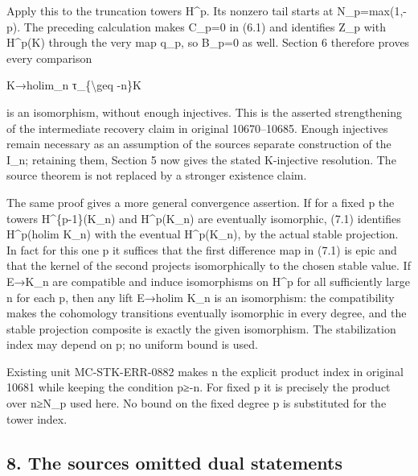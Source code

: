 Apply this to the truncation tower\textquotesingle s H\^{}p. Its nonzero tail starts at N\_\allowbreak{}p\allowbreak{}=max(1,\allowbreak{}-p)\allowbreak{}. The preceding calculation makes C\_\allowbreak{}p\allowbreak{}=0 in (6.1)\allowbreak{} and identifies Z\_\allowbreak{}p with H\textasciicircum{}p(K)\allowbreak{} through the very map q\_\allowbreak{}p,\allowbreak{} so B\_\allowbreak{}p\allowbreak{}=0 as well. Section 6 therefore proves every comparison

K\allowbreak{}→holim\_\allowbreak{}n τ\_\allowbreak{}\{\textbackslash{}geq -n\}K

is an isomorphism,\allowbreak{} without enough injectives. This is the asserted strengthening of the intermediate recovery claim in original 10670–\allowbreak{}10685. Enough injectives remain necessary as an assumption of the source\textquotesingle s separate construction of the I\_\allowbreak{}n; retaining them,\allowbreak{} Section 5 now gives the stated K-injective resolution. The source theorem is not replaced by a stronger existence claim.

The same proof gives a more general convergence assertion. If for a fixed p the towers H\textasciicircum{}\{p-1\}(K\_\allowbreak{}n)\allowbreak{} and H\textasciicircum{}p(K\_\allowbreak{}n)\allowbreak{} are eventually isomorphic,\allowbreak{} (7.1)\allowbreak{} identifies H\^{}p(holim K\_\allowbreak{}n)\allowbreak{} with the eventual H\textasciicircum{}p(K\_\allowbreak{}n)\allowbreak{},\allowbreak{} by the actual stable projection. In fact for this one p it suffices that the first difference map in (7.1)\allowbreak{} is epic and that the kernel of the second projects isomorphically to the chosen stable value. If E\allowbreak{}→K\_\allowbreak{}n are compatible and induce isomorphisms on H\^{}p for all sufficiently large n for each p,\allowbreak{} then any lift E\allowbreak{}→holim K\_\allowbreak{}n is an isomorphism:\allowbreak{} the compatibility makes the cohomology transitions eventually isomorphic in every degree,\allowbreak{} and the stable projection composite is exactly the given isomorphism. The stabilization index may depend on p; no uniform bound is used.

Existing unit MC-STK-ERR-0882 makes n the explicit product index in original 10681 while keeping the condition p≥-n. For fixed p it is precisely the product over n≥N\_\allowbreak{}p used here. No bound on the fixed degree p is substituted for the tower index.

\subsection{8. The source\textquotesingle s omitted dual statements}\label{proofs-10435-10686-the-sources-omitted-dual-statements}

